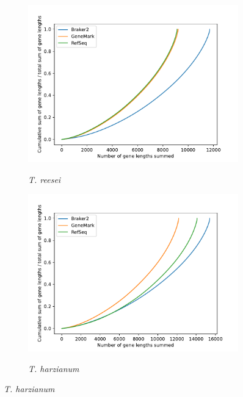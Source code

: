 \begin{figure}[ht]
  \ContinuedFloat
  \centering
    \begin{subfigure}{0.8\textwidth}
      \includegraphics[width=\textwidth]{figures/t-reesei-cumulative-gene-lengths.pdf}
      \label{fig:treesei-lengths}
      \caption{\textit{T. reesei}}
    \end{subfigure}
    \begin{subfigure}{0.8\textwidth}
      \includegraphics[width=\textwidth]{figures/t-harzianum-cumulative-gene-lengths.pdf}
      \label{fig:tharzianum-lengths}
      \caption{\textit{T. harzianum}}
    \end{subfigure}
\end{figure}
